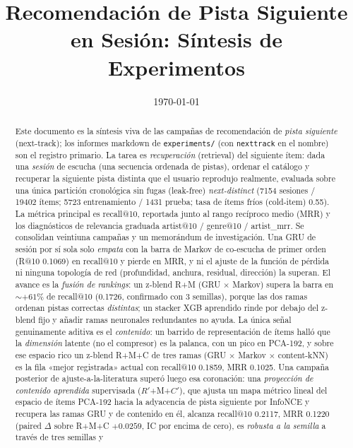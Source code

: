 \documentclass[11pt]{article}
\title{Recomendación de Pista Siguiente en Sesión: Síntesis de Experimentos}
\author{}
\date{\today}
\newcommand{\Rp}{\ensuremath{R'}}
\newcommand{\Cp}{\ensuremath{C'}}
\begin{document}
\maketitle

\begin{abstract}
Este documento es la síntesis viva de las campañas de recomendación de
\emph{pista siguiente} (next-track); los informes markdown de
\texttt{experiments/} (con \texttt{nexttrack} en el nombre) son el registro
primario. La tarea es \emph{recuperación} (retrieval) del siguiente ítem: dada
una \emph{sesión} de escucha (una secuencia ordenada de pistas), ordenar el
catálogo y recuperar la siguiente pista distinta que el usuario reprodujo
realmente, evaluada sobre una única partición cronológica sin fugas
(leak-free) \emph{next-distinct} (\num{7154} sesiones / \num{19402} ítems;
\num{5723} entrenamiento / \num{1431} prueba; tasa de ítems fríos (cold-item)
\num{0.55}). La métrica principal es recall@10, reportada junto al rango
recíproco medio (MRR) y los diagnósticos de relevancia graduada artist@10 /
genre@10 / artist\_mrr. Se consolidan veintiuna campañas y un memorándum de investigación. Una GRU de sesión por sí
sola solo \emph{empata} con la barra de Markov de co-escucha de primer orden
(R@10 \num{0.1069}) en recall@10 y pierde en MRR, y ni el ajuste de la función
de pérdida ni ninguna topología de red (profundidad, anchura, residual,
dirección) la superan. El avance es la \emph{fusión de rankings}: un z-blend
R+M (GRU $\times$ Markov) supera la barra en $\sim$$+61\%$ de recall@10
(\num{0.1726}, confirmado con 3 semillas), porque las dos ramas ordenan pistas
correctas \emph{distintas}; un stacker XGB aprendido rinde por debajo del
z-blend fijo y añadir ramas neuronales redundantes no ayuda. La única señal
genuinamente aditiva es el \emph{contenido}: un barrido de representación de
ítems halló que la \emph{dimensión} latente (no el compresor) es la palanca,
con un pico en PCA-192, y sobre ese espacio rico un z-blend R+M+C de tres ramas
(GRU $\times$ Markov $\times$ content-kNN) es la fila «mejor registrada» actual
con recall@10 \num{0.1859}, MRR \num{0.1025}. Una campaña posterior de
ajuste-a-la-literatura superó luego esa coronación: una \emph{proyección de
contenido aprendida} supervisada (\Rp+M+\Cp), que ajusta un mapa métrico lineal
del espacio de ítems PCA-192 hacia la adyacencia de pista siguiente por InfoNCE
y recupera las ramas GRU y de contenido en él, alcanza recall@10 \num{0.2117},
MRR \num{0.1220} (paired $\Delta$ sobre R+M+C $+\num{0.0259}$, IC por encima de
cero), es \emph{robusta a la semilla} a través de tres semillas y
$$
\end{abstract}
\end{document}
